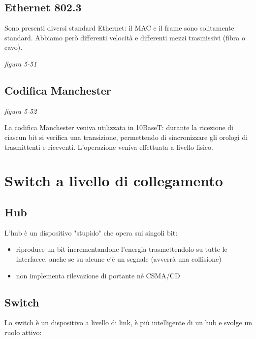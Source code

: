 \documentclass[
]{article}
\begin{document}
\hypertarget{header-n194}{%
\subsection{Ethernet 802.3}\label{header-n194}}

Sono presenti diversi standard Ethernet: il MAC e il frame sono
solitamente standard. Abbiamo però differenti velocità e differenti
mezzi trasmissivi (fibra o cavo).

\emph{figura 5-51}

\hypertarget{header-n197}{%
\subsection{Codifica Manchester}\label{header-n197}}

\emph{figura 5-52}

La codifica Manchester veniva utilizzata in 10BaseT: durante la
ricezione di ciascun bit si verifica una transizione, permettendo di
sincronizzare gli orologi di trasmittenti e riceventi. L'operazione
veniva effettuata a livello fisico.

\hypertarget{header-n200}{%
\section{Switch a livello di collegamento}\label{header-n200}}

\hypertarget{header-n201}{%
\subsection{Hub}\label{header-n201}}

L'hub è un dispositivo "stupido" che opera sui singoli bit:

\begin{itemize}
\item
  riproduce un bit incrementandone l'energia trasmettendolo su tutte le
  interfacce, anche se su alcune c'è un segnale (avverrà una collisione)
\item
  non implementa rilevazione di portante né CSMA/CD
\end{itemize}

\hypertarget{header-n208}{%
\subsection{Switch}\label{header-n208}}

Lo switch è un dispositivo a livello di link, è più intelligente di un
hub e svolge un ruolo attivo:
\end{document}

